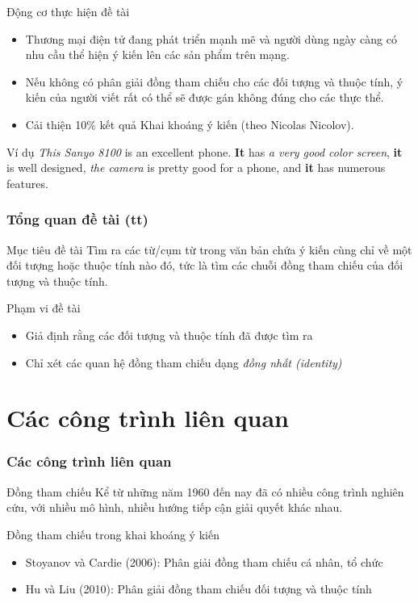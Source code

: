 \documentclass[9pt,xcolor=table,hyperref=unicode]{beamer}
\begin{document}
	\begin{frame}
		\begin{block}{Động cơ thực hiện đề tài}
			\begin{itemize}	
				\item{Thương mại điện tử đang phát triển mạnh mẽ và người dùng ngày càng có nhu cầu thể hiện ý kiến lên các sản phẩm trên mạng.}
				\item{Nếu không có phân giải đồng tham chiếu cho các đối tượng và thuộc tính, ý kiến của người viết rất có thể sẽ được gán không đúng cho các thực thể.}
				\item{Cải thiện 10\% kết quả Khai khoáng ý kiến (theo Nicolas Nicolov).}
			\end{itemize}		
		\end{block}		
		\begin{block}{Ví dụ}			
			\textit{This Sanyo 8100} is an excellent phone.  \textbf{It} has \textit{a very good color screen}, \textbf{it} is well designed, \textit{the camera} is pretty good for a phone, and \textbf{it} has numerous features.
		\end{block}
	\end{frame}

	\begin{frame}
		\frametitle{Tổng quan đề tài (tt)}
		\begin{block}{Mục tiêu đề tài}
			Tìm ra các từ/cụm từ trong văn bản chứa ý kiến cùng chỉ về một đối tượng hoặc thuộc tính nào đó, tức là tìm các chuỗi đồng tham chiếu của đối tượng và thuộc tính.
		\end{block}		
		\begin{block}{Phạm vi đề tài}
			\begin{itemize}
				\item{Giả định rằng các đối tượng và thuộc tính đã được tìm ra}
				\item{Chỉ xét các quan hệ đồng tham chiếu dạng \textit{đồng nhất (identity)}}
			\end{itemize}
		\end{block}
	\end{frame}


	\section{Các công trình liên quan}
	\begin{frame}
		\frametitle{Các công trình liên quan}
		\begin{block}{Đồng tham chiếu}
			Kể từ những năm 1960 đến nay đã có nhiều công trình nghiên cứu, với nhiều mô hình, nhiều hướng tiếp cận giải quyết khác nhau.
		\end{block}
		\begin{block}{Đồng tham chiếu trong khai khoáng ý kiến}
			\begin{itemize}
				\item{Stoyanov và Cardie (2006): Phân giải đồng tham chiếu cá nhân, tổ chức}
				\item{Hu và Liu (2010): Phân giải đồng tham chiếu đối tượng và thuộc tính}
			\end{itemize}
		\end{block}		
	\end{frame}
\end{document}
